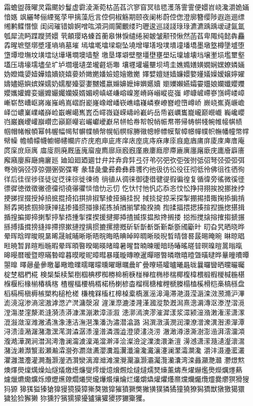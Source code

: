 \begin{appendices}
	霜蟾盥薇曜灵霜颸妙鬘虚霩淩澌菀枯菡萏泬寥窅冥毰毸濩落霅霅便嬛岧峣瀺灂姽婳愔嫕
	飒纚棽俪緸冤莩甲摛藻卮言倥侗椒觞期颐夜阑彬蔚倥偬澄廓簪缨陟遐迤逦缥缃鹣鲽憯懔
	闺闼璀错媕婀噌吰澒洞阛闠覼缕玓瓑逡巡諓諓琭琭瀌瀌踽踽叆叇氤氲瓠犀流眄蹀躞赟嬛
	茕頔璎珞螓首蘅皋惏悷缱绻昶皴皱颟顸愀然菡萏卑陬纯懿犇麤掱暒墌墍墎墏墐墒墒墓墔
	墕墖墘墖墚墛坠墝增墠墡墢墣墤墥墦墧墨墩墪樽墬墭堕墯墰墱墲坟墴墵垯墷墸墹墺墙墼
	墽垦墿壀壁壂壃壄壅壆坛壈壉壊垱壌壍埙壏壐壑壒压壔壕壖壗垒圹垆壛壜壝垄壠壡坜壣
	壤壥壦壧壨坝塆圭嫶嫷嫸嫹嫺娴嫼嫽嫾婳妫嬁嬂嬃嬄嬅嬆嬇娆嬉嬊娇嬍嬎嬏嬐嬑嬒嬓嬔
	嬕嬖嬗嬘嫱嬚嬛嬜嬞嬟嬠嫒嬢嬣嬥嬦嬧嬨嬩嫔嬫嬬奶嬬嬮嬯婴嬱嬲嬳嬴嬵嬶嬷婶嬹嬺嬻
	嬼嬽嬾嬿孀孁孂娘孄孅孆孇孆孈孉孊娈孋孊孍孎孏嫫婿媚嵭嵮嵯嵰嵱嵲嵳嵴嵵嵶嵷嵸嵹
	嵺嵻嵼嵽嵾嵿嶀嵝嶂嶃崭嶅嶆岖嶈嶉嶊嶋嶌嶍嶎嶏嶐嶑嶒嶓嵚嶕嶖嶘嶙嶚嶛嶜嶝嶞嶟峤
	嶡峣嶣嶤嶥嶦峄峃嶩嶪嶫嶬嶭崄嶯嶰嶱嶲嶳岙嶵嶶嶷嵘嶹岭嶻屿岳帋巀巁巂巃巄巅巆巇
	巈巉巊岿巌巍巎巏巐巑峦巓巅巕岩巗巘巙巚帠帡帢帣帤帨帩帪帬帯帰帱帲帴帵帷帹帺帻
	帼帽帾帿幁幂帏幄幅幆幇幈幉幊幋幌幍幎幏幐幑幒幓幖幙幚幛幜幝幞帜幠幡幢幤幥幦幧
	幨幩幪幭幮幯幰幱庍庎庑庖庘庛庝庠庡庢庣庤庥庨庩庪庬庮庯庰庱庲庳庴庵庹庺庻庼庽
	庿廀厕廃厩廅廆廇廋廌廍庼廏廐廑廒廔廕廖廗廘廙廛廜廞庑廤廥廦廧廨廭廮廯廰痈廲廵
	廸廹廻廼廽廿弁弅弆弇弉弖弙弚弜弝弞弡弢弣弤弨弩弪弫弬弭弮弰弲弪弴弶弸弻弼弽弿
	彖彗彘彚彛彜彝彞彟彴彵彶彷彸役彺彻彽彾佛徂徃徆徇徉后徍徎徏径徒従徔徕徖徙徚徛
	徜徝从徟徕御徢徣徤徥徦徧徨复循徫旁徭微徯徰徱徲徳徴徵徶德徸彻徺忁忂惔愔忇忈忉
	忔忕忖忚忛応忝忞忟忪挣挦挧挨挩挪挫挬挭挮挰掇授掉掊掋掍掎掐掑排掓掔掕挜掚挂掜
	掝掞掟掠采探掣掤掦措掫掬掭掮掯掰掱掲掳掴掵掶掸掹掺掻掼掽掾掿拣揁揂揃揅揄揆揇
	揈揉揊揋揌揍揎揑揓揔揕揖揗揘揙揤揥揦揧揨揫捂揰揱揲揳援揵揶揷揸揻揼揾揿搀搁搂
	搃搄搅搇搈搉搊搋搌搎搏搐搑搒摓摔摕摖摗摙摚摛掼摝摞摠摡斫斩斮斱斲斳斴斵斶斸旪
	旫旮旯晒晓晔晕晖晗晘晙晛晜晞晟晠晡晰晣晤晥晦晧晪晫晬晭晰晱晲晳晴晵晷晸晹晻晼
	晽晾晿暀暁暂暃暄暅暆暇晕晖暊暋暌暍暎暏暐暑暒暓暔暕暖暗旸暙暚暛暜暝暞暟暠暡暣
	暤暥暦暧暨暩暪暬暭暮暯暰昵暲暳暴暵暶暷暸暹暺暻暼暽暾暿曀曁曂曃晔曅曈曊曋曌曍
	曎曏曐曑曒曓曔曕曗曘曙曚曛曜曝曞曟旷曡曢曣曤曥曦曧昽曩曪曫晒曭曮曯椗椘椙椚椛
	検椝椞椟椠椡椢椣椤椥椦椧椨椩椪椫椬椭椮椯椰椱椲椳椴椵椶椷椸椹椺椻椼椽椾椿楀楁
	楂楃楅楆楇楈楉杨楋楌楍榴榵榶榷榸榹榺榻榼榽榾桤槀槁槂盘槄槅槆槇槈槉槊构槌枪槎
	槏槐槑槒杠槔槕槖槗滙滛滜滝滞滟滠滢滣滦滧滪滫沪滭滮滰滱渗滳滵滶滹滺浐滼滽漀漃
	漄漅漈漉溇漋漌漍漎漐漑澙熹漗漘漙沤漛漜漝漞漟漡漤漥漦漧漨漪渍漭漮漯漰漱漳漴溆
	漶漷漹漺漻漼漽漾浆潀颍潂潃潄潅潆潇潈潉潊潋潌潍潎潏潐潒潓洁潕潖潗潘沩潚潜潝潞
	潟潠潡潢潣润潥潦潧潨潩潪潫潬潭浔溃潱潲潳潴潵潶滗潸潹潺潻潼潽潾涠澁澄澃澅浇涝
	澈澉澊澋澌澍澎澏湃澐澑澒澓澔澕澖涧澘澙澚澛澜澝澞澟渑澢澣泽浍澯澰淀澲澳澴澵澶
	澷澸潇潆瀡瀢瀣瀤瀥潴泷濑瀩瀪瀫瀬瀭瀮瀯弥瀱潋瀳瀴瀵瀶瀷瀸瀹瀺瀻瀼瀽澜瀿灀灁瀺
	灂沣滠灅灆灇灈灉灊灋灌灍灎灏灐洒灒灓漓灖灗滩灙灚灛灜灏灞灟灠灡灢湾滦灥灦灧灨
	灪燝燞燠燡燢燣燤燥灿燧燨燩燪燫燮燯燰燱燲燳烩燵燵燸燹燺薰燽焘燿爀爁爂爃爄爅爇
	爈爉爊爋爌烁爎爏爑爒爓爔爕爖爗爘爙爚烂爜爝爞爟爠爡爢爣爤爥爦爧爨爩猽猾獀犸獂
	獆獇獈獉獊獋獌獍獏獐獑獒獓獔獕獖獗獘獙獚獛獜獝獞獟獠獡獢獣獤獥獦獧獩狯猃獬獭
	狝獯狞獱獳獴獶獹獽獾獿猡玁玂玃。


\end{appendices}
